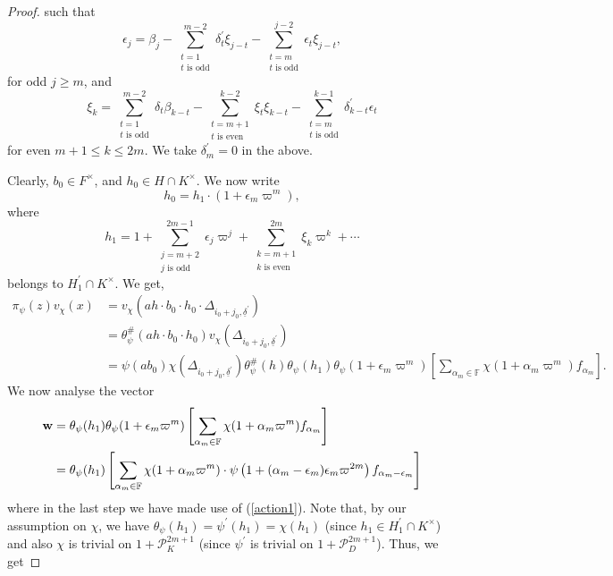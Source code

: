 \documentclass[12pt]{amsart}
\theoremstyle{definition}
\theoremstyle{remark}
\begin{document}
\begin{proof}
such that
\[\epsilon_j = \beta_j -\sum\limits_{\substack{t=1  \\    t \text{ is odd} }}^{m-2} \delta_t^\prime \xi_{j-t}- \sum\limits_{\substack{t=m  \\    t \text{ is odd} }}^{j-2} \epsilon_t \xi_{j-t},\]
for odd $j\geq m$, and
\[\xi_k = \sum\limits_{\substack{t=1  \\    t \text{ is odd} }}^{m-2}\delta_t \beta_{k-t} -\sum\limits_{\substack{t=m+1  \\    t \text{ is even} }}^{k-2} \xi_t \xi_{k-t} - \sum\limits_{\substack{t=m  \\    t \text{ is odd} }}^{k-1} \delta_{k-t}^\prime \epsilon_{t}\]
for even $m+1 \leq k \leq 2m$. We take $\delta^\prime_m =0$ in the above. 

Clearly, $b_0 \in F^\times$, and $h_0 \in H \cap K^\times$. We now write 
\[h_0 = h_1 \cdot (1 + \epsilon_m \varpi^m),\]
where 
\[h_1=  1 + \sum\limits_{\substack{j =m+2  \\    j \text{ is odd} }}^{2m-1} \epsilon_j \varpi^j + \sum\limits_{\substack{k = m +1 \\    k \text{ is even} }}^{2m} \xi_k \varpi^k +  \cdots\]
belongs to $H_1^\prime \cap K^\times$.
We get,
\begin{align*}
\pi_\psi(z) v_{\chi}(x) &= v_{\chi} \left( ah \cdot b_0 \cdot h_0 \cdot \Delta_{i_0 + j_0, \underline{\delta}^\prime} \right)  \\
&= \theta_\psi^\#(ah \cdot b_0 \cdot h_0)  v_{\chi} \left( \Delta_{ i_0 + j_0, \underline{\delta}^\prime} \right) \\
&= \psi(ab_0) \chi( \Delta_{ i_0 + j_0, \underline{\delta}^\prime} )  \theta_\psi^\#(h) \theta_\psi(h_1)  \theta_\psi (1 + \epsilon_m \varpi^m) \left[ \sum\limits_{\alpha_m \in \mathbb F} \chi(1 + \alpha_m \varpi^m) f_{\alpha_m}\right]. 
\end{align*}
We now analyse the vector 
\begin{align*}
{\bf w} &= \theta_\psi(h_1)  \theta_\psi (1 + \epsilon_m \varpi^m) \left[ \sum\limits_{\alpha_m \in \mathbb F} \chi(1 + \alpha_m \varpi^m) f_{\alpha_m}\right] \\
&= \theta_\psi(h_1) \left[ \sum\limits_{\alpha_m \in \mathbb F} \chi(1 + \alpha_m \varpi^m) \cdot \psi \left(1 +(\alpha_m-\epsilon_m)\epsilon_m \varpi^{2m}\right) f_{\alpha_m-\epsilon_m} \right]  
\end{align*}		 
where in the last step we have made use of (\ref{action1}). Note that, by our assumption on $\chi$, we have $\theta_\psi(h_1) = \psi^\prime(h_1) =\chi(h_1)$ (since $h_1 \in H_1^\prime \cap K^\times$) and also $\chi$ is trivial on $1+\mathcal P_K^{2m+1}$ (since $\psi^\prime$ is trivial on $1+\mathcal P_D^{2m+1}$). Thus, we get

\end{proof}
\end{document}
